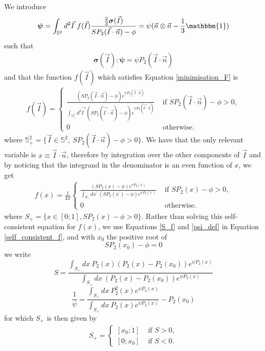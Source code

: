 \documentclass[class=article, float=false, crop=false]{standalone}
\begin{document}
We introduce
\begin{equation}
\bm{\psi} = \int_{\mathbb{S}^2}d^2\vec{I}~ f(\vec{I})\frac{\frac{2}{3}\bm{\sigma}(\vec{I})}{SP_2(\vec{I}\cdot\vec{n})-\phi} = \psi(\vec{n}\otimes\vec{n}-\frac{1}{3}\mathbbm{1})
\label{psi_def}
\end{equation}
such that
\begin{align*}
\bm{\sigma}(\vec{I}):\bm{\psi} = \psi P_2(\vec{I}\cdot\vec{n})
\end{align*}
and that the function $f(\vec{I})$ which satisfies Equation \ref{minimisation_F} is
\begin{equation}
\begin{aligned}
f(\vec{I}) = \begin{cases} \frac{(SP_2(\vec{I}\cdot\vec{n})-\phi)e^{\psi P_2(\vec{I}\cdot\vec{n})}}{\int_{\mathbb{S}^2_+}d^2\vec{I^{\prime}}~(SP_2(\vec{I^{\prime}}\cdot\vec{n})-\phi)e^{\psi P_2(\vec{I^{\prime}}\cdot\vec{n})}} &\text{ if } SP_2(\vec{I}\cdot\vec{n})-\phi > 0,\\ 0 & \text{ otherwise.} \end{cases}
\end{aligned}
\label{f_I_equilibrium}
\end{equation}
where $\mathbb{S}^2_+ = \{\vec{I}\in\mathbb{S}^2,~SP_2(\vec{I}\cdot\vec{n}) - \phi >0\}$. We have that the only relevant variable is $x\equiv\vec{I}\cdot\vec{n}$, therefore by integration over the other components of $\vec{I}$ and by noticing that the integrand in the denominator is an even function of $x$, we get
\begin{equation}
\begin{aligned}
f(x) = \frac{1}{4\pi}\begin{cases} \frac{(SP_2(x)-\phi)e^{\psi P_2(x)}}{\int_{S_+}dx^{\prime}~(SP_2(x^{\prime})-\phi)e^{\psi P_2(x^{\prime})}} &\text{ if } SP_2(x)-\phi > 0,\\ 0 & \text{ otherwise.} \end{cases}
\end{aligned}
\label{self_consistent_f}
\end{equation}
where $S_+ =\{x\in[0;1], SP_2(x)-\phi>0\}$. Rather than solving this self-consistent equation for $f(x)$, we use Equations \ref{S_f} and \ref{psi_def} in Equation \ref{self_consistent_f}, and with $x_0$ the positive root of
\begin{equation}
SP_2(x_0) - \phi = 0
\label{x0_root}
\end{equation}
we write
\begin{equation}
S = \frac{\int_{S_+}dx~P_2(x)(P_2(x)-P_2(x_0))e^{\psi P_2(x)}}{\int_{S_+}dx~(P_2(x)-P_2(x_0))e^{\psi P_2(x)}}
\label{S_eq}
\end{equation}
\begin{equation}
\frac{1}{\psi} = \frac{\int_{S_+}dx~P_2^2(x)e^{\psi P_2(x)}}{\int_{S_+}dx~P_2(x)e^{\psi P_2(x)}} - P_2(x_0)
\label{psi_eq}
\end{equation}
for which $S_+$ is then given by
\begin{align*}
S_+ = \begin{cases} [x_0;1] &\text{ if } S>0,\\ [0;x_0] &\text{ if } S<0.\end{cases}
\end{align*}
\end{document}
